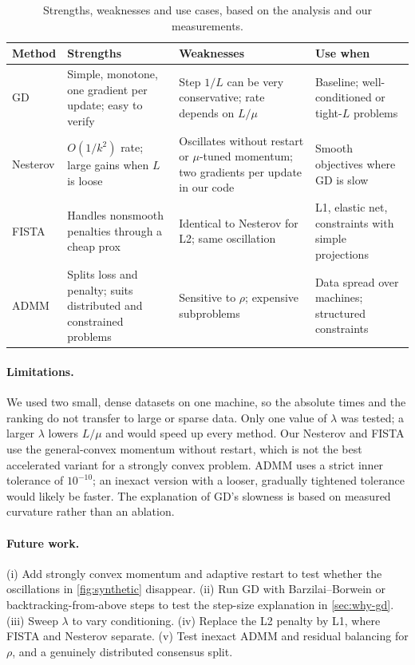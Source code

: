 \documentclass{article}
\begin{document}
\begin{table}[t]
\caption{Strengths, weaknesses and use cases, based on the analysis and our measurements.}
\label{tab:procon}
\centering
\small
\begin{tabular}{p{1.3cm}p{3.5cm}p{3.8cm}p{3.4cm}}
\toprule
Method & Strengths & Weaknesses & Use when\\
\midrule
GD & Simple, monotone, one gradient per update; easy to verify & Step $1/L$ can be very conservative; rate depends on $L/\mu$ & Baseline; well-conditioned or tight-$L$ problems\\
Nesterov & $O(1/k^2)$ rate; large gains when $L$ is loose & Oscillates without restart or $\mu$-tuned momentum; two gradients per update in our code & Smooth objectives where GD is slow\\
FISTA & Handles nonsmooth penalties through a cheap prox & Identical to Nesterov for L2; same oscillation & L1, elastic net, constraints with simple projections\\
ADMM & Splits loss and penalty; suits distributed and constrained problems & Sensitive to $\rho$; expensive subproblems & Data spread over machines; structured constraints\\
\bottomrule
\end{tabular}
\end{table}

\paragraph{Limitations.}
We used two small, dense datasets on one machine, so the absolute times and the ranking do not transfer to large or sparse data. Only one value of $\lambda$ was tested; a larger $\lambda$ lowers $L/\mu$ and would speed up every method. Our Nesterov and FISTA use the general-convex momentum without restart, which is not the best accelerated variant for a strongly convex problem. ADMM uses a strict inner tolerance of $10^{-10}$; an inexact version with a looser, gradually tightened tolerance would likely be faster. The explanation of GD's slowness is based on measured curvature rather than an ablation.

\paragraph{Future work.}
(i) Add strongly convex momentum and adaptive restart \citep{odonoghue2015adaptive} to test whether the oscillations in \cref{fig:synthetic} disappear. (ii) Run GD with Barzilai--Borwein or backtracking-from-above steps to test the step-size explanation in \cref{sec:why-gd}. (iii) Sweep $\lambda$ to vary conditioning. (iv) Replace the L2 penalty by L1, where FISTA and Nesterov separate. (v) Test inexact ADMM and residual balancing for $\rho$, and a genuinely distributed consensus split.
\end{document}
